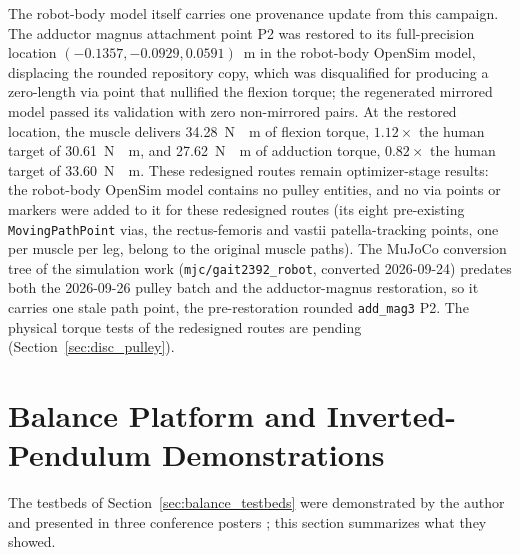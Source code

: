 The robot-body model itself carries one provenance update from this campaign. The adductor magnus attachment point P2 was restored to its full-precision location $(-0.1357, -0.0929, 0.0591)$~m in the robot-body OpenSim model, displacing the rounded repository copy, which was disqualified for producing a zero-length via point that nullified the flexion torque; the regenerated mirrored model passed its validation with zero non-mirrored pairs. At the restored location, the muscle delivers \qty{34.28}{\newton\cdot\meter} of flexion torque, $1.12\times$ the human target of \qty{30.61}{\newton\cdot\meter}, and \qty{27.62}{\newton\cdot\meter} of adduction torque, $0.82\times$ the human target of \qty{33.60}{\newton\cdot\meter}. These redesigned routes remain optimizer-stage results: the robot-body OpenSim model contains no pulley entities, and no via points or markers were added to it for these redesigned routes (its eight pre-existing \texttt{MovingPathPoint} vias, the rectus-femoris and vastii patella-tracking points, one per muscle per leg, belong to the original muscle paths). The MuJoCo conversion tree of the simulation work (\texttt{mjc/gait2392\_robot}, converted 2026-09-24) predates both the 2026-09-26 pulley batch and the adductor-magnus restoration, so it carries one stale path point, the pre-restoration rounded \texttt{add\_mag3} P2. The physical torque tests of the redesigned routes are pending (Section~\ref{sec:disc_pulley}).

\section{Balance Platform and Inverted-Pendulum Demonstrations}\label{sec:results_balance}

The testbeds of Section~\ref{sec:balance_testbeds} were demonstrated by the author and presented in three conference posters \citep{bolen_balance_2024, bolen_selfbalancing_2024, bolen_selfbalancing_srs_2024}; this section summarizes what they showed.

